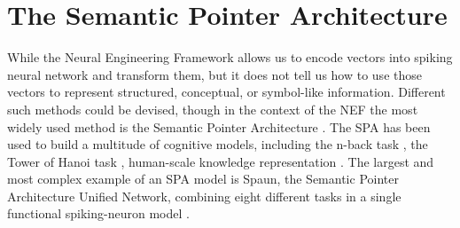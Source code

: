 \chapter{The Semantic Pointer Architecture}\label{sec:spa}
While the Neural Engineering Framework allows us to encode vectors into spiking neural network and transform them, but it does not tell us how to use those vectors to represent structured, conceptual, or symbol-like information.
Different such methods could be devised, though in the context of the NEF the most widely used method is the Semantic Pointer Architecture \parencite[SPA;][]{eliasmith2013}.
The SPA has been used to build a multitude of cognitive models, including the n-back task \parencite{gosmann2015}, the Tower of Hanoi task \parencite{stewart2011-2}, human-scale knowledge representation \parencite{crawford2016}.
The largest and most complex example of an SPA model is Spaun, the Semantic Pointer Architecture Unified Network, combining eight different tasks in a single functional spiking-neuron model \parencite{Eliasmith2012}.

